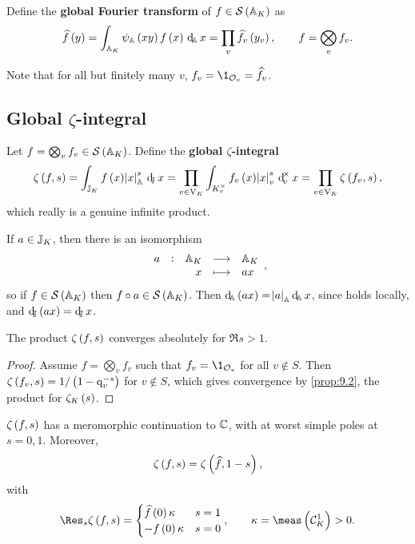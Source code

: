 \begin{definition*}
Define the \textbf{global Fourier transform} of $ f \in \SSS\br{\AA_K} $ as
$$ \widehat{f}\br{y} = \intA{\psi_\AA\br{xy}f\br{x}}{x} = \prod_v \widehat{f_v}\br{y_v}, \qquad f = \bigotimes_v f_v. $$
\end{definition*}

Note that for all but finitely many $ v $, $ f_v = \1_{\OOO_v} = \widehat{f_v} $.

\subsection{Global \texorpdfstring{$ \zeta $}{zeta}-integral}

\begin{definition*}
Let $ f = \bigotimes_v f_v \in \SSS\br{\AA_K} $. Define the \textbf{global $ \zeta $-integral}
$$ \zeta\br{f, s} = \intJ{f\br{x}\abs{x}_\AA^s}{x} = \prod_{v \in \V_K} \intvX{f_v\br{x}\abs{x}_v^s}{x} = \prod_{v \in \V_K} \zeta\br{f_v, s}, $$
which really is a genuine infinite product.
\end{definition*}


If $ a \in \mathbb{J}_K $, then there is an isomorphism
$$ \function[a]{\AA_K}{\AA_K}{x}{ax}, $$
so if $ f \in \SSS\br{\AA_K} $ then $ f \circ a \in \SSS\br{\AA_K} $. Then $ \dA\br{ax} = \abs{a}_\AA\dA x $, since holds locally, and $ \dJ\br{ax} = \dJ x $.

\begin{proposition}
The product $ \zeta\br{f, s} $ converges absolutely for $ \Re s > 1 $.
\end{proposition}

\begin{proof}
Assume $ f = \bigotimes_v f_v $ such that $ f_v = \1_{\OOO_v} $ for all $ v \notin S $. Then $ \zeta\br{f_v, s} = 1 / \br{1 - \q_v^{-s}} $ for $ v \notin S $, which gives convergence by \ref{prop:9.2}, the product for $ \zeta_K\br{s} $.
\end{proof}

\begin{theorem}
\label{thm:9.11}
$ \zeta\br{f, s} $ has a meromorphic continuation to $ \mathbb{C} $, with at worst simple poles at $ s = 0, 1 $. Moreover,
$$ \zeta\br{f, s} = \zeta\br{\widehat{f}, 1 - s}, $$
with
$$ \Res_s \zeta\br{f, s} =
\begin{cases}
\widehat{f}\br{0}\kappa & s = 1 \\
-f\br{0}\kappa & s = 0
\end{cases},
\qquad \kappa = \meas\br{\CCC_K^1} > 0. $$
\end{theorem}

